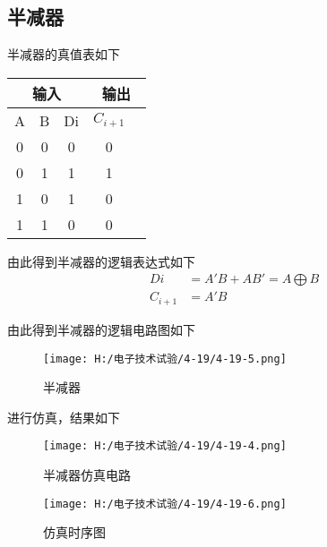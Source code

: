 \documentclass{article}
\begin{document}
\subsection{半减器}
半减器的真值表如下
\begin{table}[h]
 \centering  
 \begin{tabular}{c|c|c|c|c}
     \hline
     \multicolumn{3}{c}{输入} \vline  &  \multicolumn{2}{c}{输出} \vline     \\ \hline
           A             & B     &  Di               & $ C_{i+1} $  \\ \hline
           0             & 0     &   0               & 0            \\ \hline
           0             & 1     &   1               & 1            \\ \hline
           1             & 0     &   1               & 0            \\ \hline
           1             & 1     &   0               & 0            \\ \hline
          \end{tabular}
\end{table}
\par
由此得到半减器的逻辑表达式如下
\begin{align*}
\ Di&=A'B+AB'=A\bigoplus B\\
\ C_{i+1}&=A'B
\end{align*}
\par
由此得到半减器的逻辑电路图如下
\begin{figure}[h]
\centering
\texttt{[image: H:/电子技术试验/4-19/4-19-5.png]}
\caption{半减器} \label{fig:aa}
\end{figure}
\par 
\newpage
进行仿真，结果如下
\begin{figure}[h]
  \centering
  \texttt{[image: H:/电子技术试验/4-19/4-19-4.png]}
  \caption{半减器仿真电路} \label{fig:aa}
  \end{figure}
  \begin{figure}[h]
    \centering
    \texttt{[image: H:/电子技术试验/4-19/4-19-6.png]}
    \caption{仿真时序图} \label{fig:aa}
    \end{figure}
\end{document}
